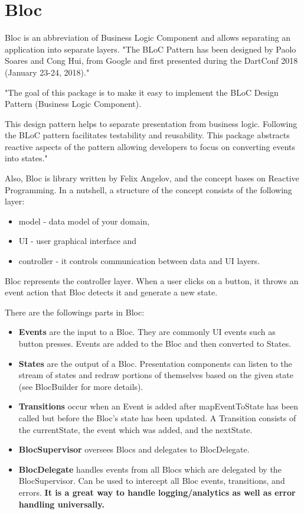 \section{Bloc}\label{sec:bloc}
Bloc is an abbreviation of Business Logic Component and allows separating an application into separate layers.\cite{bloc}
"The BLoC Pattern has been designed by Paolo Soares and Cong Hui, from Google and first presented during the DartConf 2018 (January 23-24, 2018)."\cite{didierboelens}

"The goal of this package is to make it easy to implement the BLoC Design Pattern (Business Logic Component).

This design pattern helps to separate presentation from business logic.
Following the BLoC pattern facilitates testability and reusability.
This package abstracts reactive aspects of the pattern allowing developers to focus on converting events into states."\cite{bloc}

Also, Bloc is library written by Felix Angelov, and the concept bases on Reactive Programming.\cite{bloc}
In a nutshell, a structure of the concept consists of the following layer:
\begin{itemize}
    \item model - data model of your domain,
    \item UI - user graphical interface and
    \item controller - it controls communication between data and UI layers.
\end{itemize}
Bloc represents the controller layer.
When a user clicks on a button, it throws an event action that Bloc detects it and generate a new state.

There are the followings parts in Bloc:
\begin{itemize}
    \item \textbf{Events} are the input to a Bloc.
    They are commonly UI events such as button presses.
    Events are added to the Bloc and then converted to States.
    \item \textbf{States} are the output of a Bloc.
    Presentation components can listen to the stream of states and redraw portions of themselves based on the given state (see BlocBuilder for more details).
    \item \textbf{Transitions} occur when an Event is added after mapEventToState has been called but before the Bloc's state has been updated.
    A Transition consists of the currentState, the event which was added, and the nextState.
    \item \textbf{BlocSupervisor} oversees Blocs and delegates to BlocDelegate.
    \item \textbf{BlocDelegate} handles events from all Blocs which are delegated by the BlocSupervisor.
    Can be used to intercept all Bloc events, transitions, and errors.
    \textbf{It is a great way to handle logging/analytics as well as error handling universally.}\cite{bloc}
\end{itemize}

